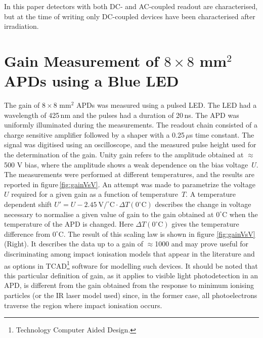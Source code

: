 \documentclass[review,number,sort&compress]{elsarticle}
\begin{document}
In this paper detectors with both DC- and AC-coupled readout are characterised, but at the time of writing only DC-coupled devices have been characterised after irradiation. 

\section{Gain Measurement of $8 \times 8$ mm$^2$ APDs using a Blue LED}
\label{sec:gain8x8led}

The gain of $8 \times 8$ mm$^2$ APDs was measured using a pulsed LED.
The LED had a wavelength of 425\,nm and the pulses had a duration of 20\,ns.
The APD was uniformly illuminated during the measurements.
The readout chain consisted of a charge sensitive amplifier followed by a shaper with a 0.25\,$\mu$s time constant.
The signal was digitised using an oscilloscope, and the measured pulse height used for the determination of the gain.
Unity gain refers to the amplitude obtained at $\approx$500 V bias, where the amplitude shows a weak dependence on the bias voltage~$U$.
The measurements were performed at different temperatures, and the results are reported in figure\,\ref{fig:gainVsV}.
An attempt was made to parametrize the  voltage~$U$ required for a given gain as a function of temperature~$T$.
A temperature dependent shift $U' = U -2.45~\textrm{V}/^\circ\textrm{C} \cdot \Delta T( 0^\circ\textrm{C})$ describes the change in voltage necessary to normalise a given value of gain to the gain obtained at $0^\circ\textrm{C}$ when the temperature of the APD is changed.
Here $\Delta T( 0^\circ\textrm{C})$ gives the temperature difference from $0^\circ\textrm{C}$. 
The result of this scaling law is shown in figure \ref{fig:gainVsV}(Right).
It describes the data up to a gain of $\approx$1000 and may prove useful for discriminating among impact ionisation models that appear in the literature and as options in TCAD\footnote{Technology Computer Aided Design.} software for modelling such devices.
It should be noted that this particular definition of gain, as it applies to visible light photodetection in an APD, is different from the gain obtained from the response to minimum ionising particles (or the IR laser model used) since, in the former case, all photoelectrons traverse the region where impact ionisation occurs.
\end{document}
